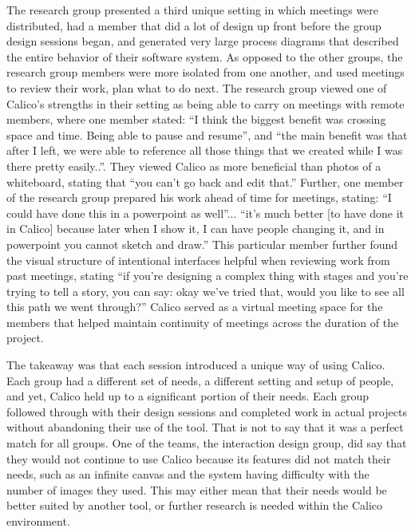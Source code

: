 The research group presented a third unique setting in which meetings were distributed, had a member that did a lot of design up front before the group design sessions began, and generated very large process diagrams that described the entire behavior of their software system. As opposed to the other groups, the research group members were more isolated from one another, and used meetings to review their work, plan what to do next. The research group viewed one of Calico's strengths in their setting as being able to carry on meetings with remote members, where one member stated: ``I think the biggest benefit was crossing space and time. Being able to pause and resume'', and ``the main benefit was that after I left, we were able to reference all those things that we created while I was there pretty easily..''. They viewed Calico as more beneficial than photos of a whiteboard, stating that ``you can't go back and edit that.'' Further, one member of the research group prepared his work ahead of time for meetings, stating: ``I could have done this in a powerpoint as well''... ``it's much better [to have done it in Calico] because later when I show it, I can have people changing it, and in powerpoint you cannot sketch and draw.'' This particular member further found the visual structure of intentional interfaces helpful when reviewing work from past meetings, stating ``if you're designing a complex thing with stages and you're trying to tell a story, you can say: okay we've tried that, would you like to see all this path we went through?'' Calico served as a virtual meeting space for the members that helped maintain continuity of meetings across the duration of the project.

%

The takeaway was that each session introduced a unique way of using Calico. Each group had a different set of needs, a different setting and setup of people, and yet, Calico held up to a significant portion of their needs. Each group followed through with their design sessions and completed work in actual projects without abandoning their use of the tool. That is not to say that it was a perfect match for all groups. One of the teams, the interaction design group, did say that they would not continue to use Calico because its features did not match their needs, such as an infinite canvas and the system having difficulty with the number of images they used. This may either mean that their needs would be better suited by another tool, or further research is needed within the Calico environment.

